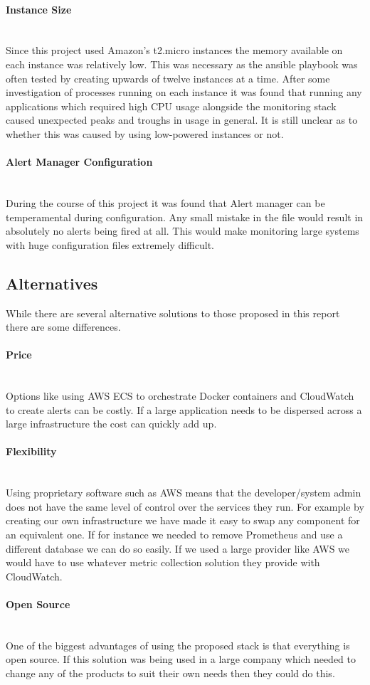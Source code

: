 \paragraph{Instance Size}\mbox{}\\
Since this project used Amazon's t2.micro instances the memory available on each instance was relatively low. This was necessary as the ansible playbook was often tested by creating upwards of twelve instances at a time. After some investigation of processes running on each instance it was found that running any applications which required high CPU usage alongside the monitoring stack caused unexpected peaks and troughs in usage in general. It is still unclear as to whether this was caused by using low-powered instances or not.

\paragraph{Alert Manager Configuration}\mbox{}\\
During the course of this project it was found that Alert manager can be temperamental during configuration. Any small mistake in the file would result in absolutely no alerts being fired at all. This would make monitoring large systems with huge configuration files extremely difficult. 

\subsection{Alternatives}
While there are several alternative solutions to those proposed in this report there are some differences.

\paragraph{Price}\mbox{}\\
Options like using AWS ECS to orchestrate Docker containers and CloudWatch to create alerts can be costly. If a large application needs to be dispersed across a large infrastructure the cost can quickly add up. 

\paragraph{Flexibility}\mbox{}\\
Using proprietary software such as AWS means that the developer/system admin does not have the same level of control over the services they run. For example by creating our own infrastructure we have made it easy to swap any component for an equivalent one. If for instance we needed to remove Prometheus and use a different database we can do so easily. If we used a large provider like AWS we would have to use whatever metric collection solution they provide with CloudWatch.

\paragraph{Open Source}\mbox{}\\
One of the biggest advantages of using the proposed stack is that everything is open source. If this solution was being used in a large company which needed to change any of the products to suit their own needs then they could do this.
